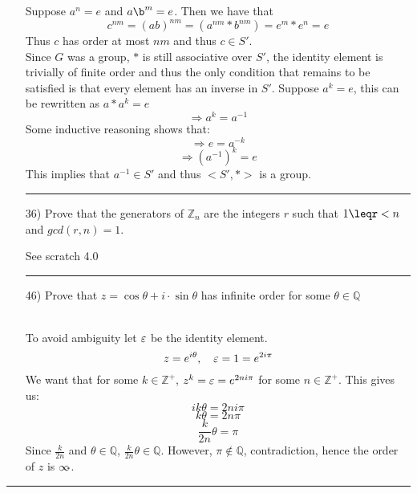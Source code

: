 \documentclass[11pt]{article}
\let\oriinfty=\infty
\def\infty{{\oriinfty\llap{\vrule height.24em depth-.2em width.2em}}}
\begin{document}
\begin{itemize}
\begin{solution}
        Suppose $a^n=e$ and $a\b^m=e$. Then we have that
        $$c^{nm}=(ab)^{nm}=\left(a^{nm}*b^{nm}\right)=e^m*e^n=e$$
        Thus $c$ has order at most $nm$ and thus $c\in S'$.\\
        Since $G$ was a group, $*$ is still associative over $S'$, the identity element is trivially of finite order and thus the only condition that remains to be satisfied is that every element has an inverse in $S'$.
        Suppose $a^k=e$, this can be rewritten as $a*a^k=e$
        $$\Rightarrow a^k=a^{-1}$$
        Some inductive reasoning shows that:
        $$\Rightarrow e=a^{-k}$$
        $$\Rightarrow \left(a^{-1}\right)^k = e$$
        This implies that $a^{-1}\in S'$ and thus $<S', *>$ is a group.
    \end{solution}
    \vspace{6pt}
    \hrule
    \vspace{6pt}
    \item[36)] Prove that the generators of $\mathbb{Z}_n$ are the integers $r$ such that $1\leqr<n$ and $gcd(r,n)=1$.
    \begin{solution} See scratch 4.0
    \end{solution}
    \vspace{6pt}
    \hrule
    \vspace{6pt}
    \item[46)] Prove that $z=\cos\theta + i\cdot \sin\theta$ has infinite order for some $\theta \in \mathbb{Q}$\\
    \begin{solution} \hfill \\
        To avoid ambiguity let $\varepsilon$ be the identity element.
        $$z=e^{i\theta}, \quad \varepsilon=1=e^{2i\pi}$$
        We want that for some $k\in \mathbb{Z}^+$, $z^k=\varepsilon=e^{2ni\pi}$ for some $n\in \mathbb{Z}^+$. This gives us:
        $$ik\theta=2ni\pi$$
        $$k\theta=2n\pi$$
        $$\frac{k}{2n}\theta=\pi$$
        Since $\frac{k}{2n}$ and $\theta \in \mathbb{Q}$, $\frac{k}{2n}\theta \in \mathbb{Q}$. However, $\pi \notin \mathbb{Q}$, contradiction,
        hence the order of $z$ is $\infty$.
    \end{solution}
\end{itemize}
\vspace{6pt}
\hrule
\vspace{6pt}
\end{document}
